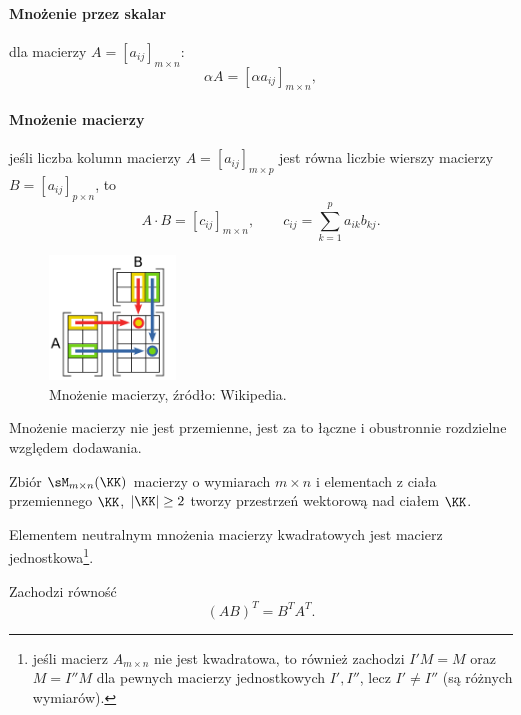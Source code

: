 \paragraph{Mnożenie przez skalar} dla macierzy $A = [a_{ij}]_{m \times n}$:
    \[ \alpha A = [\alpha a_{ij}]_{m \times n}, \]
\paragraph{Mnożenie macierzy} jeśli liczba kolumn macierzy $A = [a_{ij}]_{m \times p}$ jest równa liczbie wierszy macierzy $B = [a_{ij}]_{p \times n}$, to
    \[ A \cdot B = [c_{ij}]_{m \times n}, \qquad c_{ij} = \sum_{k=1}^p a_{ik}b_{kj}. \]

\begin{figure}[h]
    \centering
    \includegraphics[width=0.3\textwidth]{matrix_multiplication.pdf}
    \caption{Mnożenie macierzy, źródło: Wikipedia.}
\end{figure}

\begin{remark}
    Mnożenie macierzy nie jest przemienne, jest za to łączne i obustronnie rozdzielne względem dodawania.
\end{remark}

\begin{fact}
    Zbiór $\sM_{m \times n}(\KK)$ macierzy o wymiarach $m \times n$ i elementach z ciała przemiennego $\KK$, $|\KK| \geq 2$ tworzy przestrzeń wektorową nad ciałem $\KK$.
\end{fact}

\begin{fact}
    Elementem neutralnym mnożenia macierzy kwadratowych jest macierz jednostkowa\footnote{jeśli macierz $A_{m\times n}$ nie jest kwadratowa, to również zachodzi $I'M = M$ oraz $M = I''M$ dla pewnych macierzy jednostkowych $I', I''$, lecz $I' \neq I''$ (są różnych wymiarów).}.
\end{fact}

\begin{fact}
    \label{f:AB^T = B^T A^T}
    Zachodzi równość
    \[ (AB)^T = B^T A^T. \]
\end{fact}
